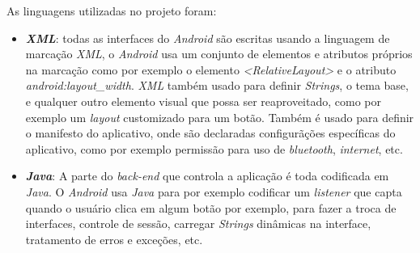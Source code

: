 \documentclass[hidelinks,12pt]{article}
\begin{document}
As linguagens utilizadas no projeto foram:
\begin{itemize}
	\item \textbf{\textit{XML}}: todas as interfaces do \textit{Android} s\~ao escritas usando a linguagem de marca\c{c}\~ao \textit{XML}, o \textit{Android} usa um conjunto de elementos e atributos pr\'oprios na marca\c{c}\~ao como por exemplo o elemento \textit{\textless{RelativeLayout}\textgreater} e o atributo \textit{android:layout\_width}. \textit{XML} tamb\'em usado para definir \textit{Strings}, o tema base, e qualquer outro elemento visual que possa ser reaproveitado, como por exemplo um \textit{layout} customizado para um bot\~ao. Tamb\'em \'e usado para definir o manifesto do aplicativo, onde s\~ao declaradas configur\~a\c{c}\~oes espec\'ificas do aplicativo, como por exemplo permiss\~ao para uso de \textit{bluetooth}, \textit{internet}, etc.
	\item \textbf{\textit{Java}}: A parte do \textit{back-end} que controla a aplica\c{c}\~ao \'e toda codificada em \textit{Java}. O \textit{Android} usa \textit{Java} para por exemplo codificar um \textit{listener} que capta quando o usu\'ario clica em algum bot\~ao por exemplo, para fazer a troca de interfaces, controle de sess\~ao, carregar \textit{Strings} dinâmicas na interface, tratamento de erros e exce\c{c}\~oes, etc.
\end{itemize}
\end{document}
